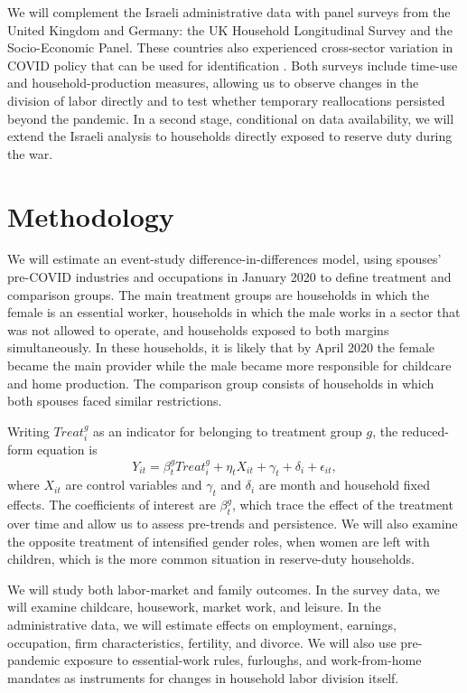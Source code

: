 \documentclass[12pt]{article}
\begin{document}
We will complement the Israeli administrative data with panel surveys from the United Kingdom and Germany: the UK Household Longitudinal Survey and the Socio-Economic Panel. These countries also experienced cross-sector variation in COVID policy that can be used for identification \citep{hancke2021similar}. Both surveys include time-use and household-production measures, allowing us to observe changes in the division of labor directly and to test whether temporary reallocations persisted beyond the pandemic. In a second stage, conditional on data availability, we will extend the Israeli analysis to households directly exposed to reserve duty during the war.

\section*{Methodology}

We will estimate an event-study difference-in-differences model, using spouses' pre-COVID industries and occupations in January 2020 to define treatment and comparison groups. The main treatment groups are households in which the female is an essential worker, households in which the male works in a sector that was not allowed to operate, and households exposed to both margins simultaneously. In these households, it is likely that by April 2020 the female became the main provider while the male became more responsible for childcare and home production. The comparison group consists of households in which both spouses faced similar restrictions.

Writing $Treat_i^g$ as an indicator for belonging to treatment group $g$, the reduced-form equation is
\begin{equation}
\label{eq:simple_DID}
Y_{it}=\beta_t^g Treat_i^g + \eta_t X_{it} + \gamma_t + \delta_i + \epsilon_{it},
\end{equation}
where $X_{it}$ are control variables and $\gamma_t$ and $\delta_i$ are month and household fixed effects. The coefficients of interest are $\beta_t^g$, which trace the effect of the treatment over time and allow us to assess pre-trends and persistence. We will also examine the opposite treatment of intensified gender roles, when women are left with children, which is the more common situation in reserve-duty households.

We will study both labor-market and family outcomes. In the survey data, we will examine childcare, housework, market work, and leisure. In the administrative data, we will estimate effects on employment, earnings, occupation, firm characteristics, fertility, and divorce. We will also use pre-pandemic exposure to essential-work rules, furloughs, and work-from-home mandates as instruments for changes in household labor division itself.
\end{document}
